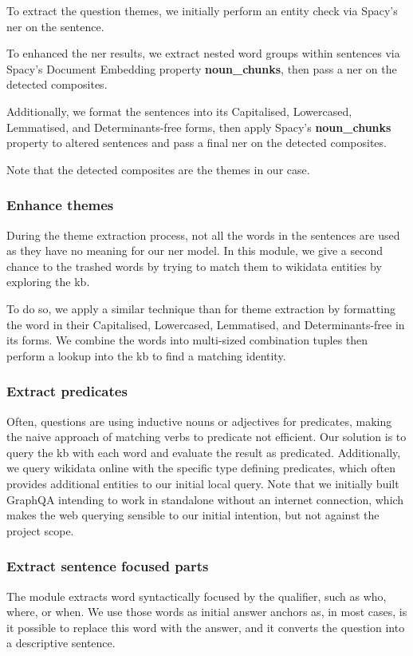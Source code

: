 To extract the question themes, we initially perform an entity check via Spacy's \gls{ner} on the sentence. 

To enhanced the \gls{ner} results, we extract nested word groups within sentences via Spacy's Document Embedding property \textbf{noun\_chunks}, then pass a \gls{ner} on the detected composites.

Additionally, we format the sentences into its Capitalised, Lowercased, Lemmatised, and Determinants-free forms, then apply Spacy's \textbf{noun\_chunks} property to altered sentences and pass a final \gls{ner} on the detected composites.

Note that the detected composites are the themes in our case.

\subsubsection{Enhance themes} 
During the theme extraction process, not all the words in the sentences are used as they have no meaning for our \gls{ner} model. In this module, we give a second chance to the trashed words by trying to match them to \gls{wikidata} entities by exploring the \gls{kb}.

To do so, we apply a similar technique than for theme extraction by formatting the word in their Capitalised, Lowercased, Lemmatised, and Determinants-free in its forms. We combine the words into multi-sized combination tuples then perform a lookup into the \gls{kb} to find a matching identity.

\subsubsection{Extract predicates} 
Often, questions are using inductive nouns or adjectives for predicates, making the naive approach of matching verbs to predicate not efficient. Our solution is to query the \gls{kb} with each word and evaluate the result as predicated. Additionally, we query \gls{wikidata} online with the specific type defining predicates, which often provides additional entities to our initial local query. Note that we initially built GraphQA intending to work in standalone without an internet connection, which makes the web querying sensible to our initial intention, but not against the project scope.

\subsubsection{Extract sentence focused parts} 
The module extracts word syntactically focused by the qualifier, such as who, where, or when. We use those words as initial answer anchors as, in most cases, is it possible to replace this word with the answer, and it converts the question into a descriptive sentence.

